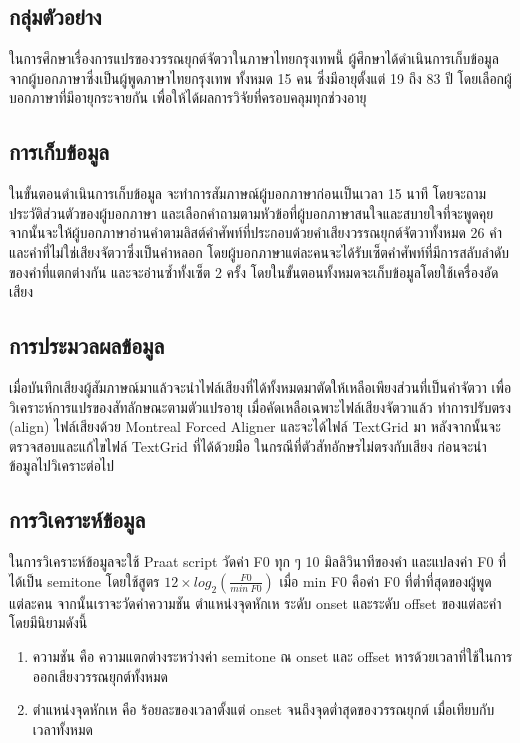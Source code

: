 \documentclass[a4paper]{article}
\begin{document}
\subsection{กลุ่มตัวอย่าง}
    ในการศึกษาเรื่องการแปรของวรรณยุกต์จัตวาในภาษาไทยกรุงเทพนี้ ผู้ศึกษาได้ดำเนินการเก็บข้อมูลจากผู้บอกภาษาซึ่งเป็นผู้พูดภาษาไทยกรุงเทพ ทั้งหมด 15 คน ซึ่งมีอายุตั้งแต่ 19 ถึง 83 ปี โดยเลือกผู้บอกภาษาที่มีอายุกระจายกัน เพื่อให้ได้ผลการวิจัยที่ครอบคลุมทุกช่วงอายุ
\subsection{การเก็บข้อมูล}
    ในขั้นตอนดำเนินการเก็บข้อมูล จะทำการสัมภาษณ์ผู้บอกภาษาก่อนเป็นเวลา 15 นาที โดยจะถามประวัติส่วนตัวของผู้บอกภาษา และเลือกคำถามตามหัวข้อที่ผู้บอกภาษาสนใจและสบายใจที่จะพูดคุย จากนั้นจะให้ผู้บอกภาษาอ่านคำตามลิสต์คำศัพท์ที่ประกอบด้วยคำเสียงวรรณยุกต์จัตวาทั้งหมด 26 คำ และคำที่ไม่ใช่เสียงจัตวาซึ่งเป็นคำหลอก โดยผู้บอกภาษาแต่ละคนจะได้รับเซ็ตคำศัพท์ที่มีการสลับลำดับของคำที่แตกต่างกัน และจะอ่านซ้ำทั้งเซ็ต 2 ครั้ง โดยในขั้นตอนทั้งหมดจะเก็บข้อมูลโดยใช้เครื่องอัดเสียง
\subsection{การประมวลผลข้อมูล}
    เมื่อบันทึกเสียงผู้สัมภาษณ์มาแล้วจะนำไฟล์เสียงที่ได้ทั้งหมดมาตัดให้เหลือเพียงส่วนที่เป็นคำจัตวา เพื่อวิเคราะห์การแปรของสัทลักษณะตามตัวแปรอายุ เมื่อคัดเหลือเฉพาะไฟล์เสียงจัตวาแล้ว ทำการปรับตรง (align) ไฟล์เสียงด้วย Montreal Forced Aligner และจะได้ไฟล์ TextGrid มา หลังจากนั้นจะตรวจสอบและแก้ไขไฟล์ TextGrid ที่ได้ด้วยมือ ในกรณีที่ตัวสัทอักษรไม่ตรงกับเสียง ก่อนจะนำข้อมูลไปวิเคราะต่อไป
\subsection{การวิเคราะห์ข้อมูล}
    ในการวิเคราะห์ข้อมูลจะใช้ Praat script วัดค่า F0 ทุก ๆ 10 มิลลิวินาทีของคำ และแปลงค่า F0 ที่ได้เป็น semitone  โดยใช้สูตร $12 \times log_2(\frac{F0}{min\ F0})$ เมื่อ min F0 คือค่า F0 ที่ต่ำที่สุดของผู้พูดแต่ละคน จากนั้นเราจะวัดค่าความชัน ตำแหน่งจุดหักเห ระดับ onset และระดับ offset ของแต่ละคำ โดยมีนิยามดังนี้
    \begin{enumerate}
        \item ความชัน คือ ความแตกต่างระหว่างค่า semitone ณ onset และ offset หารด้วยเวลาที่ใช้ในการออกเสียงวรรณยุกต์ทั้งหมด
        \item ตำแหน่งจุดหักเห คือ ร้อยละของเวลาตั้งแต่ onset จนถึงจุดต่ำสุดของวรรณยุกต์ เมื่อเทียบกับเวลาทั้งหมด
    \end{enumerate}
\end{document}
